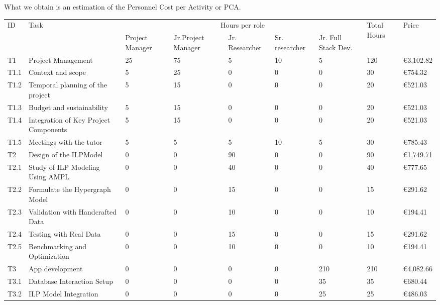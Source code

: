 What we obtain is an estimation of the Personnel Cost per Activity or PCA.
\begin{landscape}
\begin{table}[!ht]
    \centering
    \begin{tabular}{|l|l|p{1.5cm}|p{1.5cm}|l|l|p{2cm}|l|l|}
    \hline
        \multirow{2}{*}{ID} & \multirow{2}{*}{Task} & \multicolumn{5}{c|}{Hours per role} & \multirow{2}{*}{Total Hours} & \multirow{2}{*}{Price} \\\cline{3-7} 
        ~ & ~ & Project Manager & Jr.Project Manager & Jr. Researcher & Sr. researcher & Jr. Full Stack Dev. & ~ & ~ \\ \hline
        \rowcolor{black!15}
        T1 & Project Management & 25 & 75 & 5 & 10 & 5 & 120 & €3,102.82 \\ \hline
        T1.1 & Context and scope & 5 & 25 & 0 & 0 & 0 & 30 & €754.32 \\ \hline
        T1.2 & Temporal planning of the project & 5 & 15 & 0 & 0 & 0 & 20 & €521.03 \\ \hline
        T1.3 & Budget and sustainability & 5 & 15 & 0 & 0 & 0 & 20 & €521.03 \\ \hline
        T1.4 & Integration of Key Project Components & 5 & 15 & 0 & 0 & 0 & 20 & €521.03 \\ \hline
        T1.5 & Meetings with the tutor & 5 & 5 & 5 & 10 & 5 & 30 & €785.43 \\ \hline
        \rowcolor{black!15}
        T2 & Design of the ILPModel & 0 & 0 & 90 & 0 & 0 & 90 & €1,749.71 \\ \hline
        T2.1 & Study of ILP Modeling Using AMPL & 0 & 0 & 40 & 0 & 0 & 40 & €777.65 \\ \hline
        T2.2 & Formulate the Hypergraph Model & 0 & 0 & 15 & 0 & 0 & 15 & €291.62 \\ \hline
        T2.3 & Validation with Handcrafted Data & 0 & 0 & 10 & 0 & 0 & 10 & €194.41 \\ \hline
        T2.4 & Testing with Real Data & 0 & 0 & 15 & 0 & 0 & 15 & €291.62 \\ \hline
        T2.5 & Benchmarking and Optimization & 0 & 0 & 10 & 0 & 0 & 10 & €194.41 \\ \hline
        \rowcolor{black!15}
        T3 & App development & 0 & 0 & 0 & 0 & 210 & 210 & €4,082.66 \\ \hline
        T3.1 & Database Interaction Setup & 0 & 0 & 0 & 0 & 35 & 35 & €680.44 \\ \hline
        T3.2 & ILP Model Integration & 0 & 0 & 0 & 0 & 25 & 25 & €486.03 \\ \hline

\end{tabular}
\end{table}
\end{landscape}
